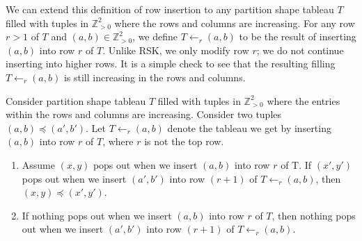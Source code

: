 \documentclass[ALCO, Unicode]{cedram}
\begin{document}
We can extend this definition of row insertion to any partition shape tableau $T$ filled with tuples in $\mathbb{Z}^2_{>0}$ where the rows and columns are increasing. For any row $r>1$ of $T$ and $(a,b)\in \mathbb{Z}^2_{>0}$, we define $T\leftarrow_{r} (a,b)$ to be the result of inserting $(a,b)$ into row $r$ of $T$. Unlike RSK, we only modify row $r$; we do not continue inserting into higher rows. It is a simple check to see that the resulting filling $T\leftarrow_{r} (a,b)$ is still increasing in the rows and columns.

\begin{lemma}\label{lemma: inserting larger things higher}
    Consider partition shape tableau $T$ filled with tuples in $\mathbb{Z}^2_{>0}$ where the entries within the rows and columns are increasing. Consider two tuples $(a,b) \preceq (a',b')$.
    Let $T\leftarrow_r (a,b)$ denote the tableau we get by inserting $(a,b)$ into row $r$ of $T$, where $r$ is not the top row. 
    \begin{enumerate}
        \item Assume $(x,y)$ pops out when we insert $(a,b)$ into row $r$ of T. If $(x',y')$ pops out when we insert $(a',b')$ into row $(r+1)$ of $T\leftarrow_r (a,b)$, then $(x,y)\preceq (x',y')$.
        \item If nothing pops out when we insert $(a,b)$ into row $r$ of $T$, then nothing pops out when we insert $(a',b')$ into row $(r+1)$ of $T\leftarrow_r (a,b)$.
        \end{enumerate}
\end{lemma}
\end{document}
